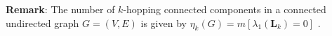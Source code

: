 \documentclass[10pt,a4paper]{article}
\theoremstyle{plain}
\theoremstyle{definition}
\begin{document}
    	    \textbf{Remark}:
    	    	The number of $k$-hopping connected components in a connected undirected graph $G=(V,E)$ is given by $\eta_k(G) = m[\lambda_1(\mathbf{L}_k)=0]$ \citep{estrada2012path}.\\
    	    
        
%    	    	
\end{document}
